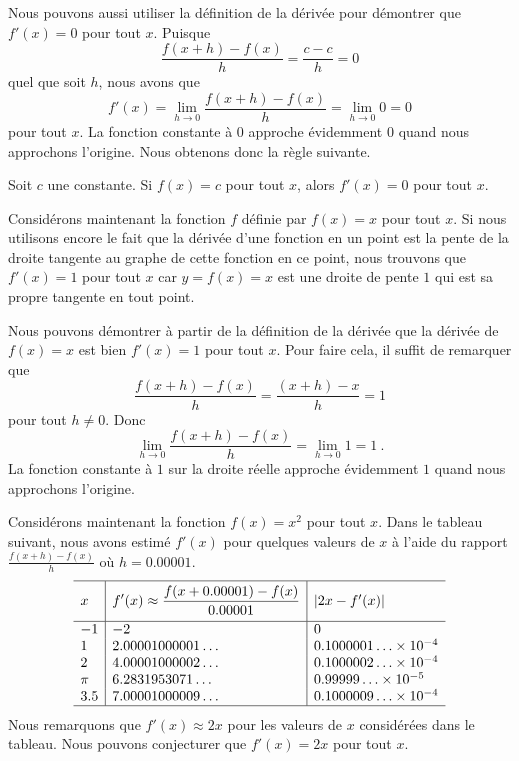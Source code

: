 {Nous pouvons aussi utiliser la définition de la dérivée pour démontrer que
$f'(x) = 0$ pour tout $x$.  Puisque
\[
\frac{f(x+h)-f(x)}{h} = \frac{c-c}{h} = 0
\]
quel que soit $h$, nous avons que
\[
f'(x) = \lim_{h\rightarrow 0} \frac{f(x+h)-f(x)}{h}
= \lim_{h\rightarrow 0} 0 = 0
\]
pour tout $x$.  La fonction constante à $0$ approche évidemment $0$
quand nous approchons l'origine.  Nous obtenons donc la règle suivante.

\begin{prop}
Soit $c$ une constante.  Si $f(x) = c$ pour tout $x$, alors
$f'(x) = 0$ pour tout $x$.
\end{prop}

Considérons maintenant la fonction $f$ définie par $f(x) = x$ pour
tout $x$.  Si nous utilisons
encore le fait que la dérivée d'une fonction en un point est la pente
de la droite tangente au graphe de cette fonction en ce point, nous
trouvons que $f'(x) = 1$ pour tout $x$ car $y = f(x)= x$ est une 
droite de pente $1$ qui est sa propre tangente en tout point.

Nous pouvons démontrer à partir de la définition de la dérivée que la
dérivée de $f(x) = x$ est bien $f'(x) = 1$ pour tout $x$.  Pour faire 
cela, il suffit de remarquer que
\[
\frac{f(x+h)-f(x)}{h} = \frac{(x+h)-x}{h} = 1
\]
pour tout $h \neq 0$.  Donc
\[
\lim_{h\rightarrow 0} \frac{f(x+h)-f(x)}{h} = \lim_{h\rightarrow 0} 1
= 1 \ .
\]
La fonction constante à $1$ sur la droite réelle approche
évidemment $1$ quand nous approchons l'origine.

Considérons maintenant la fonction $f(x)=x^2$ pour tout $x$.  Dans le
tableau suivant, nous avons estimé $f'(x)$ pour quelques valeurs de $x$ à
l'aide du rapport $\displaystyle \frac{f(x+h)-f(x)}{h}$ où
$h = 0.00001$.
\[
\begin{array}{l|l|l}
\hline
x & \rule{0em}{1.7em}
\displaystyle f'(x) \approx \frac{f(x+0.00001)-f(x)}{0.00001}
& |2x - f'(x)| \\[0.8em]
\hline
-1 & -2 & 0 \\
1 & 2.00001000001\ldots & 0.1000001\ldots \times 10^{-4} \\
2 & 4.00001000002\ldots & 0.1000002\ldots \times 10^{-4} \\
\pi & 6.2831953071\ldots & 0.99999\ldots \times 10^{-5} \\
3.5 & 7.00001000009\ldots & 0.1000009\ldots \times 10^{-4} \\
\hline
\end{array}
\]
Nous remarquons que $f'(x) \approx 2x$ pour les valeurs de $x$ considérées
dans le tableau.  Nous pouvons conjecturer que $f'(x) = 2x$ pour tout $x$.

}

